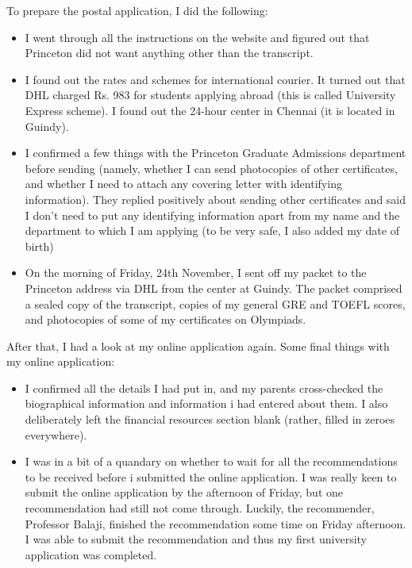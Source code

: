 \documentclass[a4paper]{amsart}
\begin{document}
To prepare the postal application, I did the following:

\begin{itemize}

\item I went through all the instructions on the website and figured out
  that Princeton did not want anything other than the transcript.

\item I found out the rates and schemes for international courier.
  It turned out that DHL charged Rs. 983 for students applying abroad
  (this is called University Express scheme). I found out the 24-hour
  center in Chennai (it is located in Guindy).

\item I confirmed a few things with the Princeton Graduate Admissions
  department before sending (namely, whether I can send photocopies of
  other certificates, and whether I need to attach any covering letter
  with identifying information). They replied positively about sending
  other certificates and said I don't need to put any identifying
  information apart from my name and the department to which I am
  applying (to be very safe, I also added my date of birth)

\item On the morning of Friday, 24th November, I sent off my packet to
  the Princeton address via DHL from the center at Guindy. The packet
  comprised a sealed copy of the transcript, copies of my general GRE
  and TOEFL scores, and photocopies of some of my certificates on
  Olympiads.
\end{itemize}

After that, I had a look at my online application again.
Some final things with my online application:

\begin{itemize}

\item I confirmed all the details I had put in, and my parents
  cross-checked the biographical information and information i had
  entered about them. I also deliberately left the financial resources
  section blank (rather, filled in zeroes everywhere).

\item I was in a bit of a quandary on whether to wait for all the
  recommendations to be received before i submitted the online
  application. I was really keen to submit the online application by
  the afternoon of Friday, but one recommendation had still not come
  through.  Luckily, the recommender, Professor Balaji, finished the
  recommendation some time on Friday afternoon. I was able to submit
  the recommendation and thus my first university application was completed.

\end{itemize}
\end{document}
